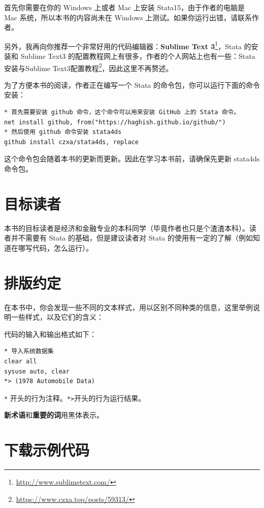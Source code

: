 \documentclass[]{ctexbook}
\renewcommand{\href}[2]{#2\footnote{\url{#1}}}
\begin{document}
首先你需要在你的 Windows 上或者 Mac 上安装 Stata15，由于作者的电脑是 Mac 系统，所以本书的内容尚未在 Windows 上测试。如果你运行出错，请联系作者。

另外，我再向你推荐一个非常好用的代码编辑器：\href{http://www.sublimetext.com/}{\textbf{Sublime Text 3}}，Stata 的安装和 Sublime Text3 的配置教程网上有很多，作者的个人网站上也有一些：\href{https://www.czxa.top/posts/59313/}{Stata安装与Sublime Text3配置教程}，因此这里不再赘述。

为了方便本书的阅读，作者正在编写一个 Stata 的命令包，你可以运行下面的命令安装：

\begin{lstlisting}
* 首先需要安装 github 命令，这个命令可以用来安装 GitHub 上的 Stata 命令。
net install github, from("https://haghish.github.io/github/")
* 然后使用 github 命令安装 stata4ds
github install czxa/stata4ds, replace
\end{lstlisting}

这个命令包会随着本书的更新而更新。因此在学习本书前，请确保先更新 stata4ds 命令包。

\hypertarget{section-3}{%
\section{目标读者}\label{section-3}}

本书的目标读者是经济和金融专业的本科同学（毕竟作者也只是个渣渣本科）。读者并不需要有 Stata 的基础，但是建议读者对 Stata 的使用有一定的了解（例如知道在哪写代码，怎么运行）。

\hypertarget{section-4}{%
\section{排版约定}\label{section-4}}

在本书中，你会发现一些不同的文本样式，用以区别不同种类的信息，这里举例说明一些样式，以及它们的含义：

代码的输入和输出格式如下：

\begin{lstlisting}
* 导入系统数据集
clear all
sysuse auto, clear
*> (1978 Automobile Data)
\end{lstlisting}

\texttt{*} 开头的行为注释。\texttt{*\textgreater{}}开头的行为运行结果。

\textbf{新术语}和\textbf{重要的词}用黑体表示。

\hypertarget{section-5}{%
\section{下载示例代码}\label{section-5}}
\end{document}
